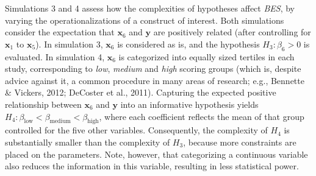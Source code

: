 \documentclass[
]{interact}
\begin{document}
                    Simulations 3 and 4 assess how the complexities of hypotheses affect
                    \emph{BES}, by varying the operationalizations of a construct of
                    interest. Both simulations consider the expectation that
                    \(\boldsymbol{x}_6\) and \(\boldsymbol{y}\) are positively related
                    (after controlling for \(\boldsymbol{x}_1\) to \(\boldsymbol{x}_5\)). In
                    simulation 3, \(\boldsymbol{x}_6\) is considered as is, and the
                    hypothesis \(H_3: \beta_6 > 0\) is evaluated. In simulation 4,
                    \(\boldsymbol{x}_6\) is categorized into equally sized tertiles in each
                    study, corresponding to \emph{low}, \emph{medium} and \emph{high}
                    scoring groups (which is, despite advice against it, a common procedure
                                    in many areas of research; e.g., Bennette \& Vickers, 2012; DeCoster et
                                    al., 2011). Capturing the expected positive relationship between
                    \(\boldsymbol{x}_6\) and \(\boldsymbol{y}\) into an informative
                    hypothesis yields
                    \(H_4: \beta_{\text{low}} < \beta_{\text{medium}} < \beta_{\text{high}}\),
                    where each coefficient reflects the mean of that group controlled for
                    the five other variables. Consequently, the complexity of \(H_4\) is
                    substantially smaller than the complexity of \(H_3\), because more
                    constraints are placed on the parameters. Note, however, that
                    categorizing a continuous variable also reduces the information in this
                    variable, resulting in less statistical power.
                    
\end{document}
